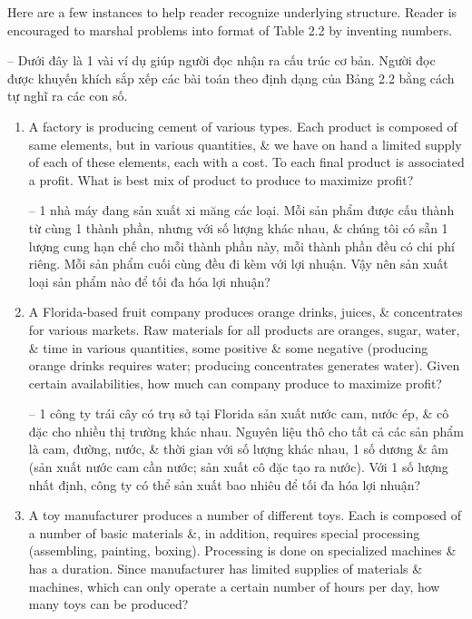 \documentclass{article}
\begin{document}
\begin{itemize}
\begin{itemize}
\begin{itemize}
            Here are a few instances to help reader recognize underlying structure. Reader is encouraged to marshal problems into format of Table 2.2 by inventing numbers.

            -- Dưới đây là 1 vài ví dụ giúp người đọc nhận ra cấu trúc cơ bản. Người đọc được khuyến khích sắp xếp các bài toán theo định dạng của Bảng 2.2 bằng cách tự nghĩ ra các con số.
            \begin{enumerate}
                \item A factory is producing cement of various types. Each product is composed of same elements, but in various quantities, \& we have on hand a limited supply of each of these elements, each with a cost. To each final product is associated a profit. What is best mix of product to produce to maximize profit?

                -- 1 nhà máy đang sản xuất xi măng các loại. Mỗi sản phẩm được cấu thành từ cùng 1 thành phần, nhưng với số lượng khác nhau, \& chúng tôi có sẵn 1 lượng cung hạn chế cho mỗi thành phần này, mỗi thành phần đều có chi phí riêng. Mỗi sản phẩm cuối cùng đều đi kèm với lợi nhuận. Vậy nên sản xuất loại sản phẩm nào để tối đa hóa lợi nhuận?
                \item A Florida-based fruit company produces orange drinks, juices, \& concentrates for various markets. Raw materials for all products are oranges, sugar, water, \& time in various quantities, some positive \& some negative (producing orange drinks requires water; producing concentrates generates water). Given certain availabilities, how much can company produce to maximize profit?

                -- 1 công ty trái cây có trụ sở tại Florida sản xuất nước cam, nước ép, \& cô đặc cho nhiều thị trường khác nhau. Nguyên liệu thô cho tất cả các sản phẩm là cam, đường, nước, \& thời gian với số lượng khác nhau, 1 số dương \& âm (sản xuất nước cam cần nước; sản xuất cô đặc tạo ra nước). Với 1 số lượng nhất định, công ty có thể sản xuất bao nhiêu để tối đa hóa lợi nhuận?
                \item A toy manufacturer produces a number of different toys. Each is composed of a number of basic materials \&, in addition, requires special processing (assembling, painting, boxing). Processing is done on specialized machines \& has a duration. Since manufacturer has limited supplies of materials \& machines, which can only operate a certain number of hours per day, how many toys can be produced?


\end{enumerate}
\end{itemize}
\end{itemize}
\end{itemize}
\end{document}

